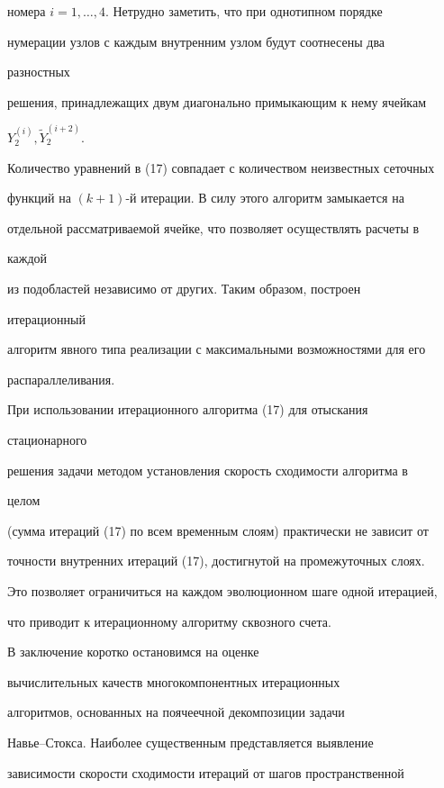 номера $i=1,\dotsc,4$. Нетрудно заметить, что при однотипном порядке


нумерации узлов с каждым внутренним узлом будут соотнесены два


разностных


решения, принадлежащих двум диагонально примыкающим к нему ячейкам


$Y_2^{(i)},\widetilde Y_2^{(i+2)}$.





Количество уравнений в (17) совпадает с количеством неизвестных сеточных


функций на $(k+1)$-й итерации. В силу этого алгоритм замыкается на


отдельной рассматриваемой ячейке, что позволяет осуществлять расчеты в


каждой


из подобластей независимо от других. Таким образом, построен


итерационный


алгоритм явного типа реализации с максимальными возможностями для его


распараллеливания.





При использовании итерационного алгоритма (17) для отыскания


стационарного


решения задачи методом установления скорость сходимости алгоритма в


целом


(сумма итераций (17) по всем временным слоям) практически не зависит от


точности внутренних итераций (17), достигнутой на промежуточных слоях.


Это позволяет ограничиться на каждом эволюционном шаге одной итерацией,


что приводит к итерационному алгоритму сквозного счета.





В заключение коротко остановимся на оценке


вычислительных качеств многокомпонентных итерационных


алгоритмов, основанных на поячеечной декомпозиции задачи


Навье--Стокса. Наиболее существенным представляется выявление


зависимости скорости сходимости итераций от шагов пространственной


